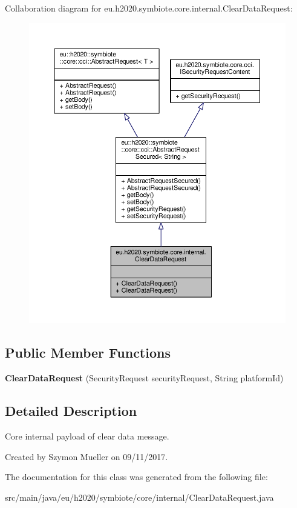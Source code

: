 Collaboration diagram for eu.\+h2020.\+symbiote.\+core.\+internal.\+Clear\+Data\+Request\+:\nopagebreak
\begin{figure}[H]
\begin{center}
\leavevmode
\includegraphics[width=350pt]{classeu_1_1h2020_1_1symbiote_1_1core_1_1internal_1_1ClearDataRequest__coll__graph}
\end{center}
\end{figure}
\subsection*{Public Member Functions}
\begin{DoxyCompactItemize}
\item 
\mbox{\label{classeu_1_1h2020_1_1symbiote_1_1core_1_1internal_1_1ClearDataRequest_af1e80857778911f88707127a548d29d0}} 
{\bfseries Clear\+Data\+Request} (Security\+Request security\+Request, String platform\+Id)
\end{DoxyCompactItemize}


\subsection{Detailed Description}
Core internal payload of clear data message.

Created by Szymon Mueller on 09/11/2017. 

The documentation for this class was generated from the following file\+:\begin{DoxyCompactItemize}
\item 
src/main/java/eu/h2020/symbiote/core/internal/Clear\+Data\+Request.\+java\end{DoxyCompactItemize}
